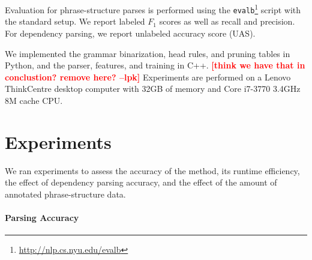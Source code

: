 \documentclass[11pt,letterpaper]{article}
\DeclareMathOperator*{\argmin}{arg\,min}
\newcommand{\ParserUrl}{\url{https://github.com/ikekonglp/Converter}}
\newcommand{\lpkcomment}[1]{\textcolor{red}{\bf \small [#1 --lpk]}}
\newcommand{\nascomment}[1]{\textcolor{blue}{\bf \small [#1 --nas]}}
\begin{document}




Evaluation for phrase-structure parses is performed using the
\texttt{evalb}\footnote{\url{http://nlp.cs.nyu.edu/evalb}} script with the
standard setup. We report labeled $F_1$ scores as well as recall and
precision. For dependency parsing, we report unlabeled accuracy score
(UAS).

We implemented the grammar binarization, head rules, and pruning
tables in Python, and the parser, features, and training in C++. 
\lpkcomment{think we have that in conclustion? remove here?}
Experiments are performed on a Lenovo ThinkCentre desktop computer
with 32GB of memory and  Core i7-3770 3.4GHz 8M cache CPU.



\section{Experiments}
\label{sec:exper}

We ran experiments to assess the accuracy of the method, its runtime
efficiency, the effect of dependency parsing accuracy,
and the effect of the amount of annotated phrase-structure
data.


\paragraph{Parsing Accuracy}
\end{document}
